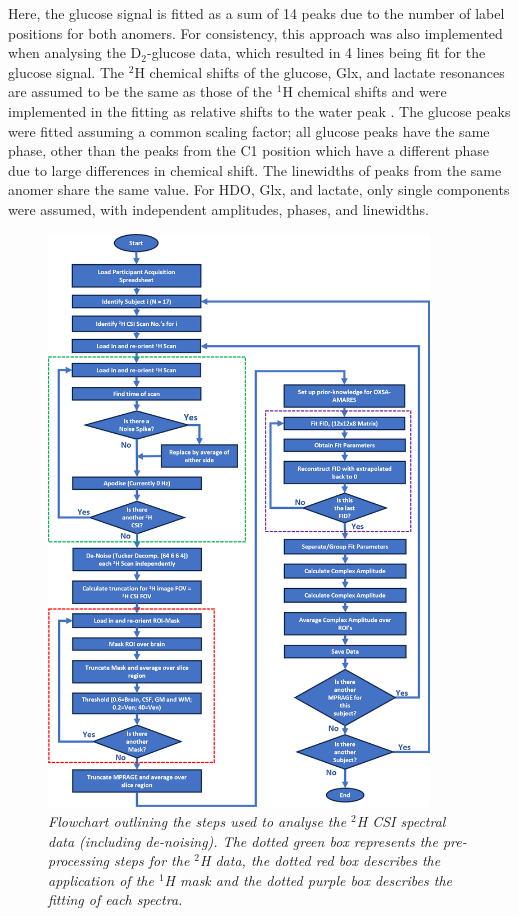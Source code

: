 Here, the glucose signal is fitted as a sum of 14 peaks due to the number of label positions for both anomers. For consistency, this approach was also implemented when analysing the D$_2$-glucose data, which resulted in 4 lines being fit for the glucose signal. The $^2$H chemical shifts of the glucose, Glx, and lactate resonances are assumed to be the same as those of the $^1$H chemical shifts \cite{Govindaraju2000ProtonMetabolites} and were implemented in the fitting as relative shifts to the water peak \cite{Meerwaldt2023InImaging}. The glucose peaks were fitted assuming a common scaling factor; all glucose peaks have the same phase, other than the peaks from the C1 position which have a different phase due to large differences in chemical shift. The linewidths of peaks from the same anomer share the same value. For \ac{HDO}, Glx, and lactate, only single components were assumed, with independent amplitudes, phases, and linewidths.

\begin{figure}
    \centering
    \includegraphics[width = 0.9\textwidth]{Figures/Glucose/2H_Flow.png}
    \caption{\textit{Flowchart outlining the steps used to analyse the $^2$H \ac{CSI} spectral data (including de-noising). The dotted green box represents the pre-processing steps for the $^2$H data, the dotted red box describes the application of the $^1$H mask and the dotted purple box describes the fitting of each spectra.}}
    \label{fig:Glu:2H_Flow}
\end{figure}

